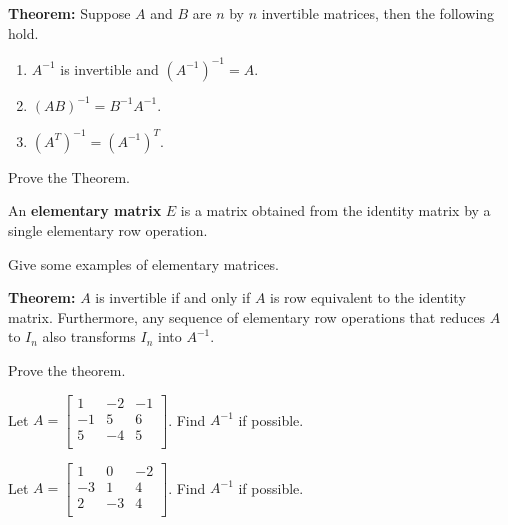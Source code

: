 \documentclass[12pt,letterpaper]{article}
\begin{document}
\begin{enumerate}
\newpage

{\bf Theorem:} Suppose $A$ and $B$ are $n$ by $n$ invertible matrices, then the following hold. 
\begin{enumerate}
\item $A^{-1}$ is invertible and $(A^{-1})^{-1}=A$.
\item $(AB)^{-1}=B^{-1} A^{-1}$.
\item $(A^{T})^{-1}=(A^{-1})^{T}$.
\end{enumerate}

\Problem Prove the Theorem.

\vfill

\newpage

\begin{defn}
An {\bf elementary matrix} $E$ is a matrix obtained from the identity matrix by a single elementary row operation.
\end{defn}

\Problem Give some examples of elementary matrices.

\vfill

{\bf Theorem:} $A$ is invertible if and only if $A$ is row equivalent to the identity matrix. Furthermore, any sequence of elementary row operations that reduces $A$ to $I_n$ also transforms $I_n$ into $A^{-1}$.

\Problem Prove the theorem.

\vfill
\vfill
\vfill

\newpage

\Problem 
\Part Let $A=\begin{bmatrix}
1 & -2 & -1\\
-1 &5 & 6\\
5 &-4 & 5\\
\end{bmatrix}$. Find $A^{-1}$ if possible.

\vfill

\Part Let $A=\begin{bmatrix}
1 & 0 & -2\\
-3 &1 & 4\\
2 &-3 & 4\\
\end{bmatrix}$. Find $A^{-1}$ if possible.

\vfill

\newpage


\end{enumerate}
\end{document}

